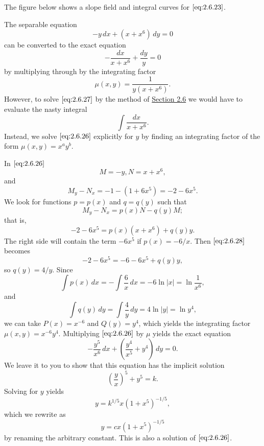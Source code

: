 \documentclass{ximera}
\begin{document}
\begin{example}
\begin{explanation}
The figure below shows a slope field and integral curves for
$\eqref{eq:2.6.23}$.


\begin{center}
\end{center}


\end{explanation}
\end{example}


\begin{example}\label{example:2.6.4}
The separable  equation
\begin{equation}\label{eq:2.6.26}
-y\,dx+(x+x^6)\,dy=0
\end{equation}
can be converted to the exact equation
\begin{equation} \label{eq:2.6.27}
-\frac{dx}{x+x^6}+\frac{dy}{y}=0
\end{equation}
by multiplying through
by the  integrating factor
$$
\mu(x,y)=\frac{1}{y(x+x^6)}.
$$
However, to solve $\eqref{eq:2.6.27}$ by the method of \href{https://xerxes.ximera.org/differentialequations/main/exactEquations/exactEquations}{Section 2.6}
we would have to evaluate the nasty integral
$$
\int \frac{dx}{x+x^6}.
$$
Instead, we solve $\eqref{eq:2.6.26}$ explicitly for $y$ by finding  an
integrating factor of the form
$\mu(x,y)=x^ay^b$.

In $\eqref{eq:2.6.26}$
$$
M=-y, N=x+x^6,
$$
and
$$
M_y-N_x=-1-(1+6x^5)=-2-6x^5.
$$
We  look for functions
$p=p(x)$ and $q=q(y)$ such that
$$
M_y-N_x=p(x)N-q(y)M;
$$
that is,
\begin{equation}\label{eq:2.6.28}
-2-6x^5=p(x)(x+x^6)+q(y)y.
\end{equation}
The right side will contain the term $-6x^5$ if $p(x)=-6/x$.   Then
$\eqref{eq:2.6.28}$ becomes
$$
-2-6x^5=-6-6x^5+q(y)y,
$$
so  $q(y)=4/y$.  Since
$$
\int p(x)\,dx=-\int\frac{6}{x}\,dx=-6\ln|x|=\ln\frac{1}{x^6},
$$
 and
$$
\int q(y)\,dy=\int\frac{4}{y}\,dy=4\ln
|y|=\ln{y^4},
$$
we can take $P(x)=x^{-6}$ and $Q(y)=y^4$,
which yields the integrating factor $\mu(x,y)=x^{-6}y^4$.
Multiplying $\eqref{eq:2.6.26}$ by  $\mu$ yields the exact equation
$$
-\frac{y^5}{x^6}\,dx+\left(\frac{y^4}{x^5}+y^4\right)
\,dy=0.
$$
 We leave it to you to 
show that this equation has the implicit solution 
$$
\left(\frac{y}{x}\right)^5+y^5=k.
$$
 Solving for $y$ yields
$$
y=k^{1/5}x(1+x^5)^{-1/5},
$$
which we rewrite as
$$
y=cx(1+x^5)^{-1/5}
$$
by renaming the arbitrary constant.
This is also a solution of $\eqref{eq:2.6.26}$.


\end{example}
\end{document}
